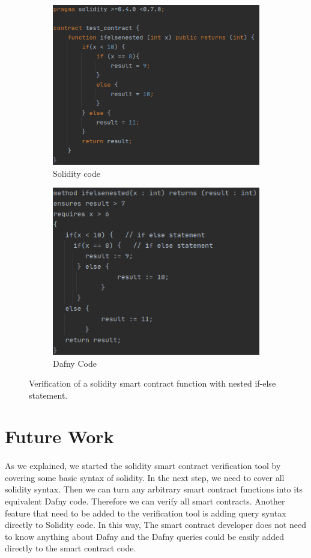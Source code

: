 \documentclass[11pt]{article}
\begin{document}
\begin{figure}
\begin{subfigure}{.50\textwidth}
  \centering
  \includegraphics[width=.8\linewidth]{figures/ifelsenested_sol.png}
  \caption{Solidity code}
  \label{fig:res2fig1}
\end{subfigure}%
\begin{subfigure}{.48\textwidth}
  \centering
  \includegraphics[width=.8\linewidth]{figures/ifelsenested_dfy.png}
  \caption{Dafny Code}
  \label{fig:res2fig2}
\end{subfigure}
\caption{Verification of a solidity smart contract function with nested if-else statement.}
\label{fig:res2}
\end{figure}


\section{Future Work}
\paragraph{}
As we explained, we started the solidity smart contract verification tool by covering some basic syntax of solidity. In the next step, we need to cover all solidity syntax. Then we can turn any arbitrary smart contract functions into its equivalent Dafny code. Therefore we can verify all smart contracts. Another feature that need to be added to the verification tool is adding query syntax directly to Solidity code. In this way, The smart contract developer does not need to know anything about Dafny and the Dafny queries could be easily added directly to the smart contract code. 



 
\end{document}
